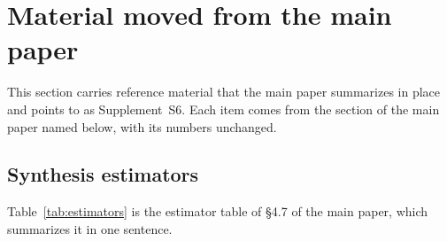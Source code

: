 \section{Material moved from the main paper}
\label{app:moved}

This section carries reference material that the main paper summarizes in place and points to as
Supplement~S6. Each item comes from the section of the main paper named below, with its numbers
unchanged.

\subsection{Synthesis estimators}
\label{subsec:moved-estimators}

Table~\ref{tab:estimators} is the estimator table of \S4.7 of the main paper, which summarizes it in
one sentence.

